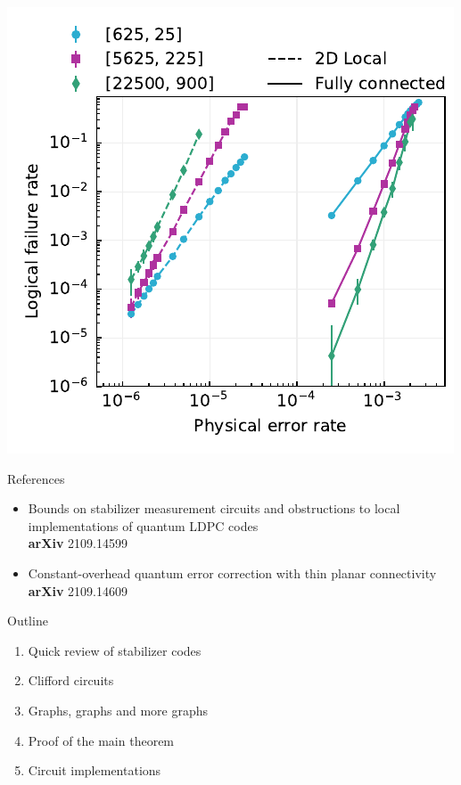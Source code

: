 \begin{frame}
  \centering
  \includegraphics{figs/comparison_alt.pdf}
\end{frame}

\begin{frame}{References}
  \begin{itemize}
    \item 
      Bounds on stabilizer measurement circuits and obstructions to
      local implementations of quantum LDPC codes \\
      {\color{spinsecondary}\textbf{arXiv}} 2109.14599
    \item 
      Constant-overhead quantum error correction with thin planar connectivity \\
      {\color{spinsecondary}\textbf{arXiv}} 2109.14609
  \end{itemize}
\end{frame}

\begin{frame}{Outline}
  \begin{enumerate}
    \item Quick review of stabilizer codes
    \item Clifford circuits
    \item Graphs, graphs and more graphs
    \item Proof of the main theorem
    \item Circuit implementations
  \end{enumerate}
\end{frame}
